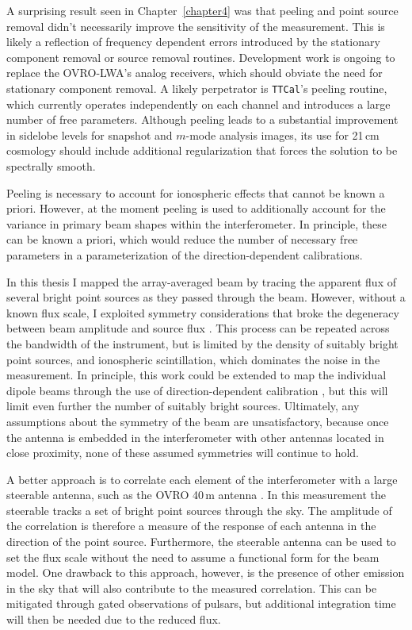 \begin{bibunit}
A surprising result seen in Chapter~\ref{chapter4} was that peeling and point source removal didn't
necessarily improve the sensitivity of the measurement. This is likely a reflection of frequency
dependent errors introduced by the stationary component removal or source removal routines.
Development work is ongoing to replace the OVRO-LWA's analog receivers, which should obviate the
need for stationary component removal.  A likely perpetrator is \texttt{TTCal}'s peeling routine,
which currently operates independently on each channel and introduces a large number of free
parameters. Although peeling leads to a substantial improvement in sidelobe levels for snapshot and
$m$-mode analysis images, its use for 21\,cm cosmology should include additional regularization that
forces the solution to be spectrally smooth.

Peeling is necessary to account for ionospheric effects that cannot be known a priori. However, at
the moment peeling is used to additionally account for the variance in primary beam shapes within
the interferometer. In principle, these can be known a priori, which would reduce the number of
necessary free parameters in a parameterization of the direction-dependent calibrations.

In this thesis I mapped the array-averaged beam by tracing the apparent flux of several bright point
sources as they passed through the beam. However, without a known flux scale, I exploited symmetry
considerations that broke the degeneracy between beam amplitude and source flux \citep[inspired
by][]{2012AJ....143...53P}. This process can be repeated across the bandwidth of the instrument, but
is limited by the density of suitably bright point sources, and ionospheric scintillation, which
dominates the noise in the measurement. In principle, this work could be extended to map the
individual dipole beams through the use of direction-dependent calibration
\citep{2008ISTSP...2..707M}, but this will limit even further the number of suitably bright sources.
Ultimately, any assumptions about the symmetry of the beam are unsatisfactory, because once the
antenna is embedded in the interferometer with other antennas located in close proximity, none of
these assumed symmetries will continue to hold.

A better approach is to correlate each element of the interferometer with a large steerable antenna,
such as the OVRO 40\,m antenna \citep[e.g.,][]{2016SPIE.9906E..0DB}. In this measurement the
steerable tracks a set of bright point sources through the sky. The amplitude of the correlation is
therefore a measure of the response of each antenna in the direction of the point source.
Furthermore, the steerable antenna can be used to set the flux scale without the need to assume a
functional form for the beam model. One drawback to this approach, however, is the presence of other
emission in the sky that will also contribute to the measured correlation. This can be mitigated
through gated observations of pulsars, but additional integration time will then be needed due to
the reduced flux.


\end{bibunit}
